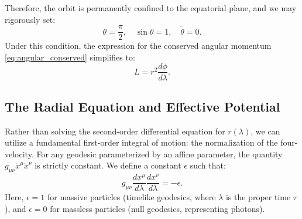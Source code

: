 \documentclass[11pt, a4paper]{report}
\begin{document}
Therefore, the orbit is permanently confined to the equatorial plane, and we may rigorously set:
\begin{equation}
\theta = \frac{\pi}{2}, \quad \sin\theta = 1, \quad \dot{\theta} = 0.
\end{equation}
Under this condition, the expression for the conserved angular momentum \eqref{eq:angular_conserved} simplifies to:
\begin{equation}
L = r^{2} \frac{d\phi}{d\lambda}.
\end{equation}

\subsection{The Radial Equation and Effective Potential}

Rather than solving the second-order differential equation for $r(\lambda)$, we can utilize a fundamental first-order integral of motion: the normalization of the four-velocity. For any geodesic parameterized by an affine parameter, the quantity $g_{\mu\nu}\dot{x}^{\mu}\dot{x}^{\nu}$ is strictly constant. We define a constant $\epsilon$ such that:
\begin{equation}
g_{\mu\nu}\frac{dx^{\mu}}{d\lambda}\frac{dx^{\nu}}{d\lambda} = -\epsilon.
\end{equation}
Here, $\epsilon = 1$ for massive particles (timelike geodesics, where $\lambda$ is the proper time $\tau$), and $\epsilon = 0$ for massless particles (null geodesics, representing photons).
\end{document}
